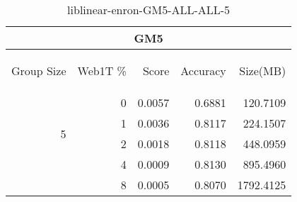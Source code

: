 \begin{center}
\begin{table}[htbp] 
 \begin{center}
\begin{tabular}{ | r | r | r | r | r |}
\hline
\multicolumn{5}{|c|}{GM5}\\
\hline
\begin{sideways}Group Size\end{sideways} & \begin{sideways}Web1T \%\end{sideways} & \begin{sideways}Score\end{sideways} & \begin{sideways}Accuracy\end{sideways} & \begin{sideways}Size(MB)\end{sideways}\\
\hline
\multirow{4}{*}{5}
 & 0 & 0.0057 & 0.6881 & 120.7109\\ \cline{2-5}
 & 1 & 0.0036 & 0.8117 & 224.1507\\ \cline{2-5}
 & 2 & 0.0018 & 0.8118 & 448.0959\\ \cline{2-5}
 & 4 & 0.0009 & 0.8130 & 895.4960\\ \cline{2-5}
 & 8 & 0.0005 & 0.8070 & 1792.4125\\ \cline{2-5}
\hline
\end{tabular}
\caption{liblinear-enron-GM5-ALL-ALL-5}
\label{table:liblinear-enron-GM5-ALL-ALL-5}
\end{center}
 \end{table}
\end{center}


